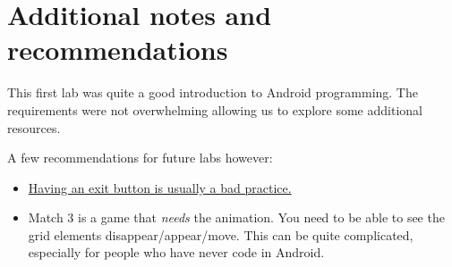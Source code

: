 \documentclass{article}
\begin{document}
\section{Additional notes and recommendations}

This first lab was quite a good introduction to Android programming. The requirements were not overwhelming allowing us to explore some additional resources. 

A few recommendations for future labs however:

\begin{itemize}
\item \href{https://www.quora.com/Why-dont-Android-apps-have-an-exit-button}{Having an exit button is usually a bad practice.}
\item Match 3 is a game that \textit{needs} the animation. You need to be able to see the grid elements disappear/appear/move. This can be quite complicated, especially for people who have never code in Android.
\end{itemize}
\end{document}

